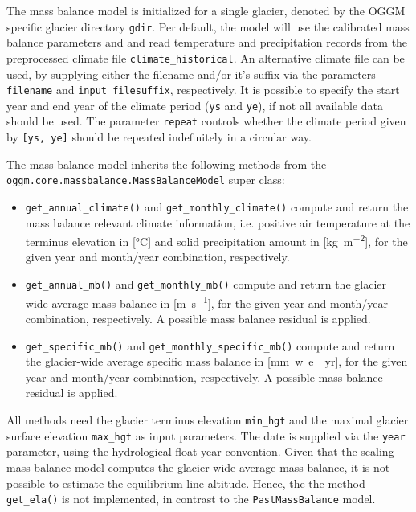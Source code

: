             The mass balance model is initialized for a single glacier, denoted by the OGGM specific glacier directory \lstinline`gdir`. Per default, the model will use the calibrated mass balance parameters \mustar{} and \bias{} and read temperature and precipitation records from the preprocessed climate file \lstinline`climate_historical`. An alternative climate file can be used, by supplying either the filename and/or it's suffix via the parameters \lstinline`filename` and \lstinline`input_filesuffix`, respectively. It is possible to specify the start year and end year of the climate period (\lstinline`ys` and \lstinline`ye`), if not all available data should be used. The parameter \lstinline`repeat` controls whether the climate period given by \lstinline`[ys, ye]` should be repeated indefinitely in a circular way.

            The \vas{} mass balance model inherits the following methods from the \lstinline`oggm.core.massbalance.MassBalanceModel` super class:
            \begin{itemize}
                \item \lstinline`get_annual_climate()` and \lstinline`get_monthly_climate()` compute and return the mass balance relevant climate information, i.e. positive air temperature at the terminus elevation in [\si{\celsius}] and solid precipitation amount in [\si{\kg\per\square\m}], for the given year and month/year combination, respectively.
                \item \lstinline`get_annual_mb()` and \lstinline`get_monthly_mb()` compute and return the glacier wide average mass balance in [\si{\m\per\s}], for the given year and month/year combination, respectively. A possible mass balance residual \bias{} is applied.
                \item \lstinline`get_specific_mb()` and \lstinline`get_monthly_specific_mb()` compute and return the glacier-wide average specific mass balance in [\si{mm w.e.\per yr}], for the given year and month/year combination, respectively. A possible mass balance residual \bias{} is applied.
            \end{itemize}
            All methods need the glacier terminus elevation \lstinline`min_hgt` and the maximal glacier surface elevation \lstinline`max_hgt` as input parameters. The date is supplied via the \lstinline`year` parameter, using the hydrological float year convention. Given that the scaling mass balance model computes the glacier-wide average mass balance, it is not possible to estimate the equilibrium line altitude. Hence, the the method \lstinline`get_ela()` is not implemented, in contrast to the \lstinline`PastMassBalance` model.
        
